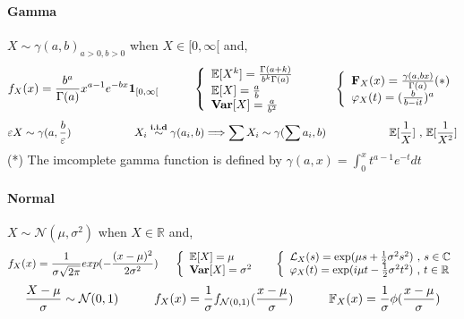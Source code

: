 \documentclass[a4paper,10pt]{article}
\begin{document}
\paragraph{Gamma} $X\sim \gamma(a,b)_{a>0,b>0}$ when $X \in [0,\infty[$ and,
\[
f_{X}(x) = \frac{b^a}{\Gamma(a)} x^{a-1} e^{-bx} \mathbf{1}_{[0,\infty[}
\hspace{10mm}
\left\{
\begin{array}{l}
\mathbb{E}[X^k]=\frac{\Gamma(a+k)}{b^k\Gamma(a)} \\
\mathbb{E}[X]=\frac{a}{b} \\
\textbf{Var}[X]=\frac{a}{b^2} 
\end{array}\right.
\hspace{10mm}
\left\{
\begin{array}{l}
\textbf{F}_X(x) = \frac{\gamma(a,bx)}{\Gamma(a)} (*)  \\
\varphi_{X}(t) = (\frac{b}{b - it})^a
\end{array}\right.
\]
\[
\varepsilon X \sim \gamma(a,\frac{b}{\varepsilon})
\hspace{20mm}
X_i \stackrel{\textbf{i.i.d}}{\sim} \gamma(a_i,b) \Longrightarrow \sum X_i \sim \gamma(\sum a_i, b)
\hspace{20mm}
\mathbb{E}[\frac{1}{X}] \text{ , } \mathbb{E}[\frac{1}{X^2}]
\]
(*) The imcomplete gamma function is defined by $\gamma(a,x) = \int_{0}^{x} t^{a-1}e^{-t}dt $

\paragraph{Normal} $X \sim \mathcal{N}(\mu,\sigma^2)$ when $X \in \mathbb{R}$ and,
\[
f_{X}(x) = \frac{1}{\sigma \sqrt{2\pi}} exp (-\frac{(x-\mu)^2}{2\sigma^2})
\hspace{5mm}
\left\{
\begin{array}{l}
\mathbb{E}[X]=\mu \\
\textbf{Var}[X]=\sigma^2
\end{array}\right.
\hspace{5mm}
\left\{
\begin{array}{l}
\mathcal{L}_{X}(s) =  \text{exp}(\mu s  + \frac{1}{2} \sigma^2 s^2) \hbox{ , } s\in\mathbb{C} \\
\varphi_{X}(t)     =  \text{exp}(i\mu t - \frac{1}{2} \sigma^2 t^2) \hbox{ , } t\in\mathbb{R}
\end{array}\right.
\]
\[
\frac{X - \mu}{\sigma} \sim \mathcal{N}(0,1)
\hspace{10mm}
f_{X}(x) = \frac{1}{\sigma}f_{\mathcal{N}(0,1)}(\frac{x-\mu}{\sigma})
\hspace{10mm}
\mathbb{F}_{X}(x) = \frac{1}{\sigma}\phi(\frac{x-\mu}{\sigma})
\]
\end{document}
